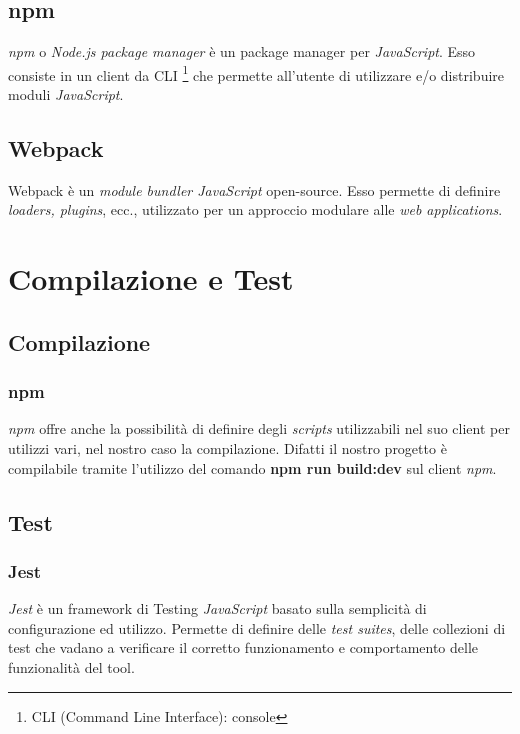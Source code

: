 \documentclass[twoside]{supsistudent}
\begin{document}
\subsection{npm}

\textit{npm} o \textit{Node.js package manager} è un package manager per 
\textit{JavaScript}. Esso consiste in un client da CLI 
\footnote{CLI (Command Line Interface): console}
che permette all'utente di utilizzare e/o distribuire moduli 
\textit{JavaScript}.

\subsection{Webpack}

Webpack è un \textit{module bundler JavaScript} open-source. Esso permette di 
definire \textit{loaders, plugins}, ecc., utilizzato per un approccio modulare
alle \textit{web applications}.

\section{Compilazione e Test}

\subsection{Compilazione}

\subsubsection{npm}

\textit{npm} offre anche la possibilità di definire degli \textit{scripts}
utilizzabili nel suo client per utilizzi vari, nel nostro caso la compilazione.
Difatti il nostro progetto è compilabile tramite l'utilizzo del comando
\textbf{npm run build:dev} sul client \textit{npm}.

\subsection{Test}

\subsubsection{Jest}

\textit{Jest} è un framework di Testing \textit{JavaScript} basato sulla
semplicità di configurazione ed utilizzo. Permette di definire delle 
\textit{test suites}, delle collezioni di test che vadano a verificare il
corretto funzionamento e comportamento delle funzionalità del tool.
\end{document}
